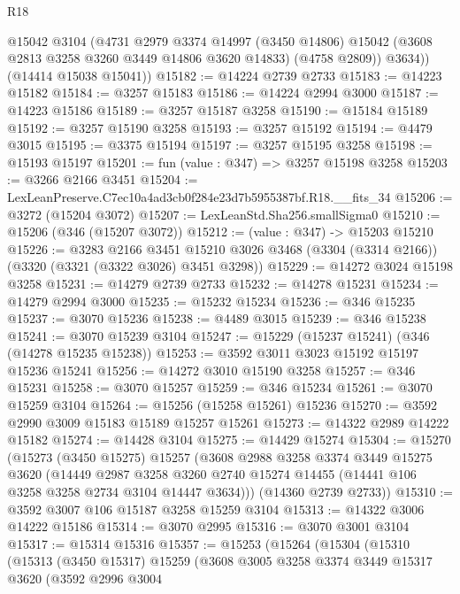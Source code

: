 \begin{lexlean}{R18}
\begin{coremodule}
          @15042
          @3104
          (@4731
            @2979
            @3374
            @14997
            (@3450 @14806)
            @15042
            (@3608 @2813 @3258 @3260 @3449 @14806 @3620 @14833)
            (@4758 @2809))
          @3634))
      (@14414 @15038 @15041))
@15182 := @14224 @2739 @2733
@15183 := @14223 @15182
@15184 := @3257 @15183
@15186 := @14224 @2994 @3000
@15187 := @14223 @15186
@15189 := @3257 @15187 @3258
@15190 := @15184 @15189
@15192 := @3257 @15190 @3258
@15193 := @3257 @15192
@15194 := @4479 @3015
@15195 := @3375 @15194
@15197 := @3257 @15195 @3258
@15198 := @15193 @15197
@15201 := fun (value : @347) => @3257 @15198 @3258
@15203 := @3266 @2166 @3451
@15204 := LexLeanPreserve.C7ec10a4ad3cb0f284e23d7b5955387bf.R18.__fits_34
@15206 := @3272 (@15204 @3072)
@15207 := LexLeanStd.Sha256.smallSigma0
@15210 := @15206 (@346 (@15207 @3072))
@15212 := (value : @347) -> @15203 @15210
@15226 := @3283
    @2166
    @3451
    @15210
    @3026
    @3468
    (@3304 (@3314 @2166))
    (@3320 (@3321 (@3322 @3026) @3451 @3298))
@15229 := @14272 @3024 @15198 @3258
@15231 := @14279 @2739 @2733
@15232 := @14278 @15231
@15234 := @14279 @2994 @3000
@15235 := @15232 @15234
@15236 := @346 @15235
@15237 := @3070 @15236
@15238 := @4489 @3015
@15239 := @346 @15238
@15241 := @3070 @15239 @3104
@15247 := @15229 (@15237 @15241) (@346 (@14278 @15235 @15238))
@15253 := @3592 @3011 @3023 @15192 @15197 @15236 @15241
@15256 := @14272 @3010 @15190 @3258
@15257 := @346 @15231
@15258 := @3070 @15257
@15259 := @346 @15234
@15261 := @3070 @15259 @3104
@15264 := @15256 (@15258 @15261) @15236
@15270 := @3592 @2990 @3009 @15183 @15189 @15257 @15261
@15273 := @14322 @2989 @14222 @15182
@15274 := @14428 @3104
@15275 := @14429 @15274
@15304 := @15270
    (@15273
      (@3450 @15275)
      @15257
      (@3608
        @2988
        @3258
        @3374
        @3449
        @15275
        @3620
        (@14449
          @2987
          @3258
          @3260
          @2740
          @15274
          @14455
          (@14441 @106 @3258 @3258 @2734 @3104 @14447 @3634)))
      (@14360 @2739 @2733))
@15310 := @3592 @3007 @106 @15187 @3258 @15259 @3104
@15313 := @14322 @3006 @14222 @15186
@15314 := @3070 @2995
@15316 := @3070 @3001 @3104
@15317 := @15314 @15316
@15357 := @15253
    (@15264
      (@15304
        (@15310
          (@15313
            (@3450 @15317)
            @15259
            (@3608
              @3005
              @3258
              @3374
              @3449
              @15317
              @3620
              (@3592
                @2996
                @3004

\end{coremodule}
\end{lexlean}
